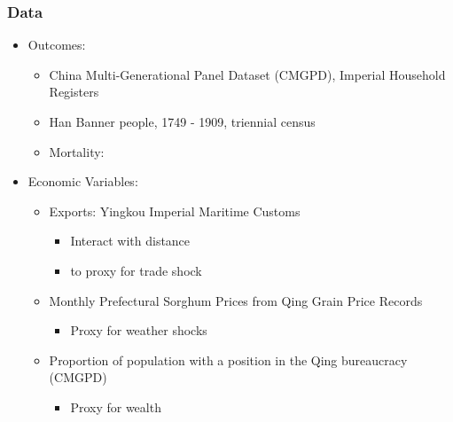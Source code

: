 \begin{frame}[label=data]
\frametitle{Data}
\begin{itemize} %
\item Outcomes: \hyperlink{mortratio}{} \hyperlink{stylizedex}{}

\begin{itemize} %
\item China Multi-Generational Panel Dataset (CMGPD), Imperial Household Registers
\item Han Banner people, 1749 - 1909, triennial census
\item Mortality: \hyperlink{morttrends120}{}\\
\end{itemize} %
\pause
\item Economic Variables:
\begin{itemize} %
\item Exports: Yingkou Imperial Maritime Customs \hyperlink{exports}{}
{\small
\begin{itemize} %
\item Interact with distance \hyperlink{distance}{}
\item to proxy for trade shock \hyperlink{tradeshock}{}\\
\end{itemize}
} %
\pause

\item Monthly Prefectural Sorghum Prices from Qing Grain Price Records
{\small 
\begin{itemize} %
\item  Proxy for weather shocks\\
\end{itemize}} %

\pause
\item Proportion of population with a position in the Qing bureaucracy (CMGPD)
{\small 
\begin{itemize} %
\item  Proxy for wealth
\end{itemize}} %

\end{itemize} %
\end{itemize} %

\end{frame}


